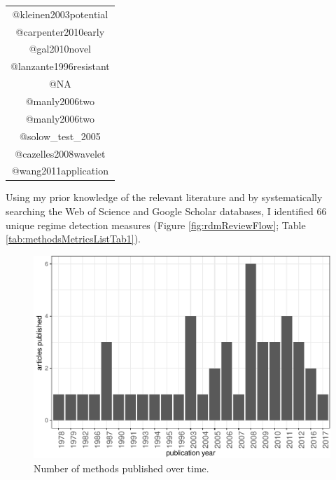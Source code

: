 \documentclass[12pt,twoside,openany]{reedthesis}
\begin{document}
\begin{longtable}[]{@{}c@{}}
\begin{minipage}[t]{0.46\columnwidth}
@kleinen2003potential\strut
\end{minipage}\tabularnewline
\begin{minipage}[t]{0.46\columnwidth}\centering
@carpenter2010early\strut
\end{minipage}\tabularnewline
\begin{minipage}[t]{0.46\columnwidth}\centering
@gal2010novel\strut
\end{minipage}\tabularnewline
\begin{minipage}[t]{0.46\columnwidth}\centering
@lanzante1996resistant\strut
\end{minipage}\tabularnewline
\begin{minipage}[t]{0.46\columnwidth}\centering
@NA\strut
\end{minipage}\tabularnewline
\begin{minipage}[t]{0.46\columnwidth}\centering
@manly2006two\strut
\end{minipage}\tabularnewline
\begin{minipage}[t]{0.46\columnwidth}\centering
@manly2006two\strut
\end{minipage}\tabularnewline
\begin{minipage}[t]{0.46\columnwidth}\centering
@solow\_test\_2005\strut
\end{minipage}\tabularnewline
\begin{minipage}[t]{0.46\columnwidth}\centering
@cazelles2008wavelet\strut
\end{minipage}\tabularnewline
\begin{minipage}[t]{0.46\columnwidth}\centering
@wang2011application\strut
\end{minipage}\tabularnewline
\bottomrule
\end{longtable}
Using my prior knowledge of the relevant literature and by systematically searching the Web of Science and Google Scholar databases, I identified 66 unique regime detection measures (Figure \ref{fig:rdmReviewFlow}; Table \ref{tab:methodsMetricsListTab1}).
\begin{figure}
\centering
\includegraphics{_myDissertation_files/figure-latex/jrnlYearFig-1.pdf}
\caption{\label{fig:jrnlYearFig}Number of methods published over time.}
\end{figure}
\end{document}
